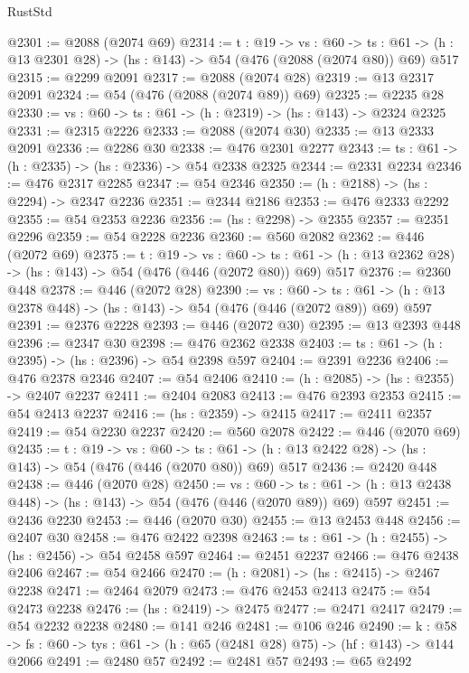 \begin{lexlean}{RustStd}
\begin{coremodule}
@2301 := @2088 (@2074 @69)
@2314 := {t : @19} ->
  {vs : @60} ->
  {ts : @61} -> (h : @13 @2301 @28) -> (hs : @143) -> @54 (@476 (@2088 (@2074 @80)) @69) @517
@2315 := @2299 @2091
@2317 := @2088 (@2074 @28)
@2319 := @13 @2317 @2091
@2324 := @54 (@476 (@2088 (@2074 @89)) @69)
@2325 := @2235 @28
@2330 := {vs : @60} -> {ts : @61} -> (h : @2319) -> (hs : @143) -> @2324 @2325
@2331 := @2315 @2226
@2333 := @2088 (@2074 @30)
@2335 := @13 @2333 @2091
@2336 := @2286 @30
@2338 := @476 @2301 @2277
@2343 := {ts : @61} -> (h : @2335) -> (hs : @2336) -> @54 @2338 @2325
@2344 := @2331 @2234
@2346 := @476 @2317 @2285
@2347 := @54 @2346
@2350 := (h : @2188) -> (hs : @2294) -> @2347 @2236
@2351 := @2344 @2186
@2353 := @476 @2333 @2292
@2355 := @54 @2353 @2236
@2356 := (hs : @2298) -> @2355
@2357 := @2351 @2296
@2359 := @54 @2228 @2236
@2360 := @560 @2082
@2362 := @446 (@2072 @69)
@2375 := {t : @19} ->
  {vs : @60} ->
  {ts : @61} -> (h : @13 @2362 @28) -> (hs : @143) -> @54 (@476 (@446 (@2072 @80)) @69) @517
@2376 := @2360 @448
@2378 := @446 (@2072 @28)
@2390 := {vs : @60} ->
  {ts : @61} -> (h : @13 @2378 @448) -> (hs : @143) -> @54 (@476 (@446 (@2072 @89)) @69) @597
@2391 := @2376 @2228
@2393 := @446 (@2072 @30)
@2395 := @13 @2393 @448
@2396 := @2347 @30
@2398 := @476 @2362 @2338
@2403 := {ts : @61} -> (h : @2395) -> (hs : @2396) -> @54 @2398 @597
@2404 := @2391 @2236
@2406 := @476 @2378 @2346
@2407 := @54 @2406
@2410 := (h : @2085) -> (hs : @2355) -> @2407 @2237
@2411 := @2404 @2083
@2413 := @476 @2393 @2353
@2415 := @54 @2413 @2237
@2416 := (hs : @2359) -> @2415
@2417 := @2411 @2357
@2419 := @54 @2230 @2237
@2420 := @560 @2078
@2422 := @446 (@2070 @69)
@2435 := {t : @19} ->
  {vs : @60} ->
  {ts : @61} -> (h : @13 @2422 @28) -> (hs : @143) -> @54 (@476 (@446 (@2070 @80)) @69) @517
@2436 := @2420 @448
@2438 := @446 (@2070 @28)
@2450 := {vs : @60} ->
  {ts : @61} -> (h : @13 @2438 @448) -> (hs : @143) -> @54 (@476 (@446 (@2070 @89)) @69) @597
@2451 := @2436 @2230
@2453 := @446 (@2070 @30)
@2455 := @13 @2453 @448
@2456 := @2407 @30
@2458 := @476 @2422 @2398
@2463 := {ts : @61} -> (h : @2455) -> (hs : @2456) -> @54 @2458 @597
@2464 := @2451 @2237
@2466 := @476 @2438 @2406
@2467 := @54 @2466
@2470 := (h : @2081) -> (hs : @2415) -> @2467 @2238
@2471 := @2464 @2079
@2473 := @476 @2453 @2413
@2475 := @54 @2473 @2238
@2476 := (hs : @2419) -> @2475
@2477 := @2471 @2417
@2479 := @54 @2232 @2238
@2480 := @141 @246
@2481 := @106 @246
@2490 := {k : @58} ->
  {fs : @60} -> {tys : @61} -> (h : @65 (@2481 @28) @75) -> (hf : @143) -> @144 @2066
@2491 := @2480 @57
@2492 := @2481 @57
@2493 := @65 @2492

\end{coremodule}
\end{lexlean}
